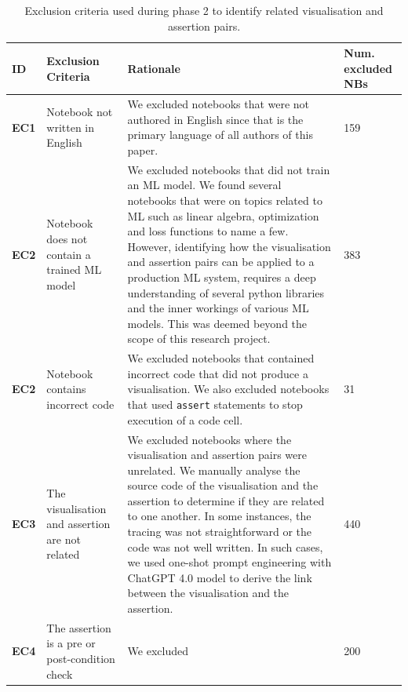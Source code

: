 \documentclass[acmsmall,screen,review,anonymous]{acmart}
\begin{document}
\begin{table}
  \centering
  \caption{Exclusion criteria used during phase 2 to identify related visualisation and assertion pairs.}
  \begin{tabular}{l p{} p{} p{}}
    \toprule
    \textbf{ID} &
    \textbf{Exclusion Criteria} &
    \textbf{Rationale} &
    \textbf{Num. excluded NBs}\\
    \midrule
    \textbf{EC1} &
    Notebook not written in English &
    We excluded notebooks that were not authored in English since that is the primary language of all authors of this paper. &
    159\\
    \textbf{EC2} &
    Notebook does not contain a trained ML model &
    We excluded notebooks that did not train an ML model. We found several notebooks that were on topics related to ML such as linear algebra, optimization and loss functions to name a few. However, identifying how the visualisation and assertion pairs can be applied to a production ML system, requires a deep understanding of several python libraries and the inner workings of various ML models. This was deemed beyond the scope of this research project. &
    383\\
    \textbf{EC2} &
    Notebook contains incorrect code &
    We excluded notebooks that contained incorrect code that did not produce a visualisation. We also excluded notebooks that used \texttt{assert} statements to stop execution of a code cell. &
    31\\
    \textbf{EC3} &
    The visualisation and assertion are not related &
    We excluded notebooks where the visualisation and assertion pairs were unrelated. We manually analyse the source code of the visualisation and the assertion to determine if they are related to one another. In some instances, the tracing was not straightforward or the code was not well written. In such cases, we used one-shot prompt engineering with ChatGPT 4.0 model to derive the link between the visualisation and the assertion. &
    440\\
    \textbf{EC4} &
    The assertion is a pre or post-condition check &
    We excluded &
    200\\
    \bottomrule
  \end{tabular}
  \label{tab:exclusion-criteria}
\end{table}
\end{document}
